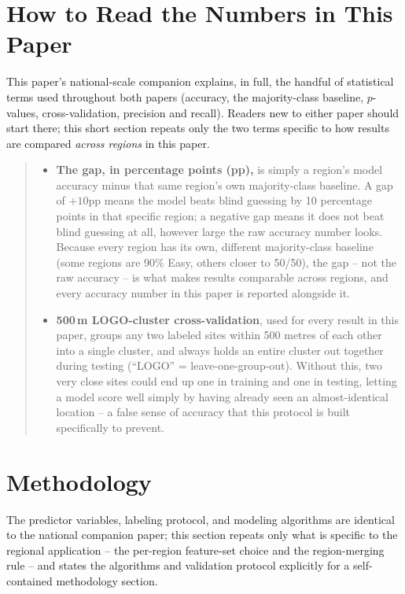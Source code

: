 \documentclass[11pt,a4paper]{article}
\newenvironment{termbox}
  {\begin{quote}\small\begin{itemize}[leftmargin=1.1em]}
  {\end{itemize}\end{quote}}
\begin{document}
\section{How to Read the Numbers in This Paper}
\label{sec:reading-guide}
This paper's national-scale companion explains, in full, the handful of statistical terms used throughout both papers (accuracy, the majority-class baseline, $p$-values, cross-validation, precision and recall). Readers new to either paper should start there; this short section repeats only the two terms specific to how results are compared \emph{across regions} in this paper.

\begin{termbox}
\item \textbf{The gap, in percentage points (pp),} is simply a region's model accuracy minus that same region's own majority-class baseline. A gap of $+10$pp means the model beats blind guessing by 10 percentage points in that specific region; a negative gap means it does not beat blind guessing at all, however large the raw accuracy number looks. Because every region has its own, different majority-class baseline (some regions are 90\% Easy, others closer to 50/50), the gap -- not the raw accuracy -- is what makes results comparable across regions, and every accuracy number in this paper is reported alongside it.
\item \textbf{500\,m LOGO-cluster cross-validation}, used for every result in this paper, groups any two labeled sites within 500 metres of each other into a single cluster, and always holds an entire cluster out together during testing (``LOGO'' = leave-one-group-out). Without this, two very close sites could end up one in training and one in testing, letting a model score well simply by having already seen an almost-identical location -- a false sense of accuracy that this protocol is built specifically to prevent.
\end{termbox}

\section{Methodology}
\label{sec:methodology}
The predictor variables, labeling protocol, and modeling algorithms are identical to the national companion paper; this section repeats only what is specific to the regional application -- the per-region feature-set choice and the region-merging rule -- and states the algorithms and validation protocol explicitly for a self-contained methodology section.
\end{document}
